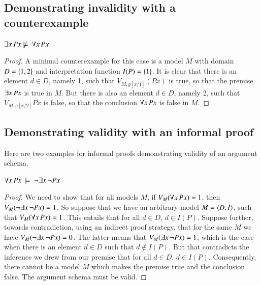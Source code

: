 \documentclass[nobib,nofonts]{tufte-handout}
\begin{document}
\subsection{Demonstrating invalidity with a counterexample}
\label{sec:demonstr-inval-with}

\begin{claim}
 $\exists x \thinspace Px  \not \models \ \forall x \thinspace Px$
\end{claim}
\begin{proof}
A minimal counterexample for this case is a model $M$ with domain $D = \left\{1,2\right\}$ and interpretation function $I(P) = \left\{1\right\}$.
It is clear that there is an element $d \in D$, namely 1, such that $V_{M,g[x/1]}(Px)$ is true, so that the premise $\exists x \thinspace Px$ is true in $M$.
But there is also an element $d \in D$, namely 2, such that $V_{M, g[x/2]} Px$ is false, so that the conclusion $\forall x \thinspace Px$ is false in $M$.
\end{proof}

\subsection{Demonstrating validity with an informal proof}
\label{sec:demonstr-valid-with}

Here are two examples for informal proofs demonstrating validity of an argument schema.

\begin{claim}
  $\forall x \thinspace Px \ \models \ \neg \exists x \thinspace \neg Px$
\end{claim}

\begin{proof}
  We need to show that for all models $M$, if $V_{M}(\forall x \thinspace Px) = 1$, then $V_{M}(\neg \exists x \thinspace \neg Px) = 1$.
  So suppose that we have an arbitrary model $M = \left \langle D,I\right\rangle$, such that $V_{M}(\forall x \thinspace Px) = 1$.
  This entails that for all $d \in D$, $d \in I(P)$.
  Suppose further, towards contradiction, using an indirect proof strategy, that for the same $M$ we have $V_{M}(\neg \exists x \thinspace \neg Px) = 0$.
  The latter means that $V_{M}(\exists x \thinspace \neg Px) = 1$, which is the case when there is an element $d \in D$ such that $d \not \in I(P)$.
  But that contradicts the inference we drew from our premise that for all $d \in D$, $d \in I(P)$.
  Consequently, there cannot be a model $M$ which makes the premise true and the conclusion false.
  The argument schema must be valid.
\end{proof}
\end{document}
